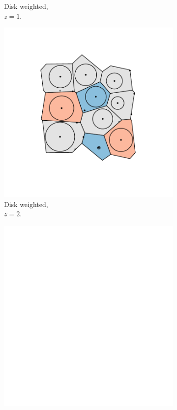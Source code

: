 \begin{figure}[tb]
\begin{subfigure}[b]{0.23\textwidth}
         \caption{Disk weighted, \\$z=1$.}
         \label{fig:cut10b}
     \end{subfigure}
     \hfill
      \begin{subfigure}[b]{0.23\textwidth}
         \centering
         \includegraphics[width=\textwidth]{./figures/quasi2d/cut_z20_b.pdf}
         \caption{Disk weighted, \\$z=2$.}
         \label{fig:cut20b}
     \end{subfigure}
     \hfill
     \begin{subfigure}[b]{0.23\textwidth}
         \centering
         \includegraphics[width=\textwidth]{./figures/quasi2d/empty.pdf}

\end{subfigure}
\end{figure}

